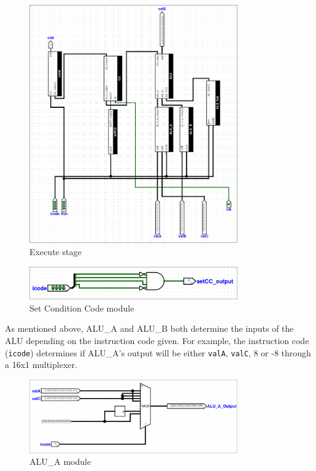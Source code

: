\documentclass{article}
\begin{document}
\begin{figure}[H]
    \centering
    \includegraphics[width=0.8\textwidth]{./images/execute.png}
    \caption{Execute stage}
\end{figure}

\begin{figure}[H]
    \centering
    \includegraphics[width=0.8\textwidth]{./images/set_cc.png}
    \caption{Set Condition Code module}
\end{figure}

As mentioned above, ALU\_A and ALU\_B both determine the inputs of the ALU depending on the instruction code given.
For example, the instruction code (\lstinline{icode}) determines if ALU\_A's output will be either \lstinline{valA}, \lstinline{valC}, 8 or -8 through a 16x1 multiplexer. 

\begin{figure}[H]
    \centering
    \includegraphics[width=0.8\textwidth]{./images/alu_a.png}
    \caption{ALU\_A module}
\end{figure}
\end{document}
